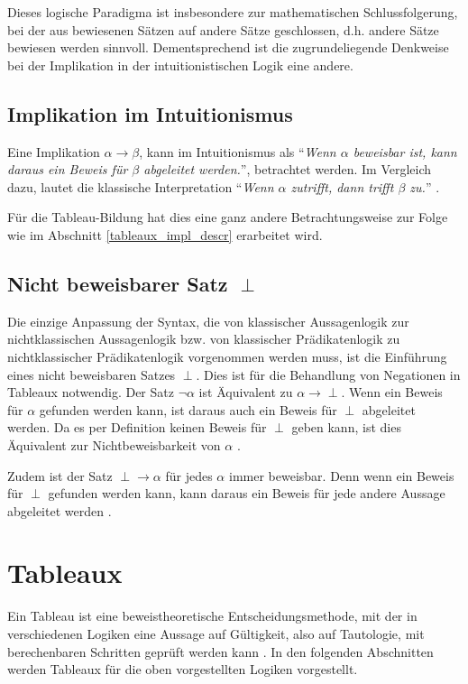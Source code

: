 Dieses logische Paradigma ist insbesondere zur mathematischen Schlussfolgerung, bei der aus bewiesenen Sätzen auf andere Sätze geschlossen, d.h. andere Sätze bewiesen werden sinnvoll. Dementsprechend ist die zugrundeliegende Denkweise bei der Implikation in der intuitionistischen Logik eine andere.

\subsection{\label{impl_in_intu}Implikation im Intuitionismus}
Eine Implikation $\alpha\rightarrow\beta$, kann im Intuitionismus als ``\textit{Wenn $\alpha$ beweisbar ist, kann daraus ein Beweis für $\beta$ abgeleitet werden.}'', betrachtet werden. Im Vergleich dazu, lautet die klassische Interpretation ``\textit{Wenn $\alpha$ zutrifft, dann trifft $\beta$ zu.}'' \cite{B62}.

Für die Tableau-Bildung hat dies eine ganz andere Betrachtungsweise zur Folge wie im Abschnitt \ref{tableaux_impl_descr} erarbeitet wird.

\subsection{\label{intu_non_proof_sentence}Nicht beweisbarer Satz $\perp$}
Die einzige Anpassung der Syntax, die von klassischer Aussagenlogik zur nichtklassischen Aussagenlogik bzw. von klassischer Prädikatenlogik zu nichtklassischer Prädikatenlogik vorgenommen werden muss, ist die Einführung eines nicht beweisbaren Satzes $\perp$. Dies ist für die Behandlung von Negationen in Tableaux notwendig. Der Satz $\neg\alpha$ ist Äquivalent zu $\alpha\rightarrow\perp$. Wenn ein Beweis für $\alpha$ gefunden werden kann, ist daraus auch ein Beweis für $\perp$ abgeleitet werden. Da es per Definition keinen Beweis für $\perp$ geben kann, ist dies Äquivalent zur Nichtbeweisbarkeit von $\alpha$ \cite{DGHP99}.

Zudem ist der Satz $\perp\rightarrow\alpha$ für jedes $\alpha$ immer beweisbar. Denn wenn ein Beweis für $\perp$ gefunden werden kann, kann daraus ein Beweis für jede andere Aussage abgeleitet werden \cite{DGHP99}.

\section{Tableaux}
Ein Tableau ist eine beweistheoretische Entscheidungsmethode, mit der in verschiedenen Logiken eine Aussage auf Gültigkeit, also auf Tautologie, mit berechenbaren Schritten geprüft werden kann \cite{DGHP99}. In den folgenden Abschnitten werden Tableaux für die oben vorgestellten Logiken vorgestellt.


